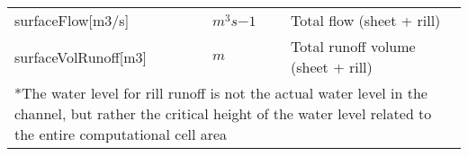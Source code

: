 \begin{table}[t]
\begin{tabular}{llp{}}
 surfaceFlow[m3/s]   &  $m^3s{-1}$ & Total flow (sheet + rill)  \\
 surfaceVolRunoff[m3]   &   $m$  & Total runoff volume (sheet + rill) \\
  \hline
   \hline
   \multicolumn{3}{p{\textwidth}}{*The water level for rill runoff is not the actual water level in the channel, but rather the critical height of the water level related to the entire computational cell area}
 \end{tabular}
 \end{table}


